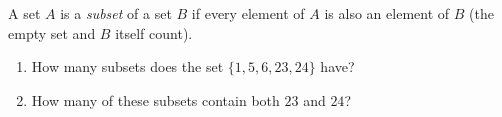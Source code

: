 A set $A$ is a \emph{subset} of a set $B$ if every element of $A$ is also an element of $B$ (the empty set and $B$ itself count).
\begin{enumerate}
\item[(a)] How many subsets does the set $\{1,5,6,23,24\}$ have?
\item[(b)] How many of these subsets contain both $23$ and $24$?
\end{enumerate}
